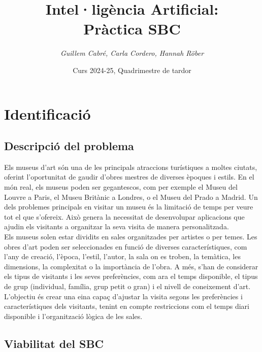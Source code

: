 \documentclass[a4paper]{article}
\title{\textbf{Intel·ligència Artificial:\\
		Pràctica SBC}}
\author{\emph{Guillem Cabré, Carla Cordero, Hannah Röber}}
\date{Curs 2024-25, Quadrimestre de tardor}
\begin{document}
	
	\begin{titlepage}
		\clearpage\maketitle
		\thispagestyle{empty}
	\end{titlepage}
	
	\tableofcontents
	\clearpage
	
	\section{Identificació}
	
	\subsection{Descripció del problema}
	
	Els museus d’art són una de les principals atraccions turístiques a moltes ciutats, oferint l’oportunitat de gaudir d’obres mestres de diverses èpoques i estils. En el món real, els museus poden ser gegantescos, com per exemple el Museu del Louvre a Paris, el Museu Britànic a Londres, o el Museu del Prado a Madrid. Un dels problemes principals en visitar un museu és la limitació de temps per veure tot el que s’ofereix. Això genera la necessitat de desenvolupar aplicacions que ajudin els visitants a organitzar la seva visita de manera personalitzada. \\
	
	Els museus solen estar dividits en sales organitzades per artistes o per temes. Les obres d’art poden ser seleccionades en funció de diverses característiques, com l’any de creació, l’època, l’estil, l’autor, la sala on es troben, la temàtica, les dimensions, la complexitat o la importància de l’obra. A més, s’han de considerar els tipus de visitants i les seves preferències, com ara el temps disponible, el tipus de grup (individual, família, grup petit o gran) i el nivell de coneixement d’art. \\
	
	L’objectiu és crear una eina capaç d’ajustar la visita segons les preferències i característiques dels visitants, tenint en compte restriccions com el temps diari disponible i l’organització lògica de les sales.
	
	\subsection{Viabilitat del SBC}
	
\end{document}
